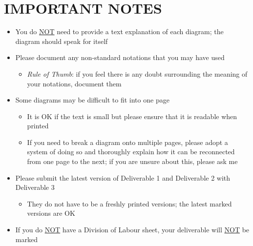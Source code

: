 \documentclass[]{article}
\begin{document}

\newpage
\section*{IMPORTANT NOTES}
\begin{itemize}
	\item You do \underline{NOT} need to provide a text explanation of each diagram; the diagram should speak for itself
	\item Please document any non-standard notations that you may have used
	\begin{itemize}
		\item \emph{Rule of Thumb}: if you feel there is any doubt surrounding the meaning of your notations, document them
	\end{itemize}
	\item Some diagrams may be difficult to fit into one page
	\begin{itemize}
		\item It is OK if the text is small but please ensure that it is readable when printed
		\item If you need to break a diagram onto multiple pages, please adopt a system of doing so and thoroughly explain how it can be reconnected from one page to the next; if you are unsure about this, please ask me
	\end{itemize}
	\item Please submit the latest version of Deliverable 1 and Deliverable 2 with Deliverable 3
	\begin{itemize}
		\item They do not have to be a freshly printed versions; the latest marked versions are OK
	\end{itemize}
	\item If you do \underline{NOT} have a Division of Labour sheet, your deliverable will \underline{NOT} be marked
\end{itemize}
\end{document}
